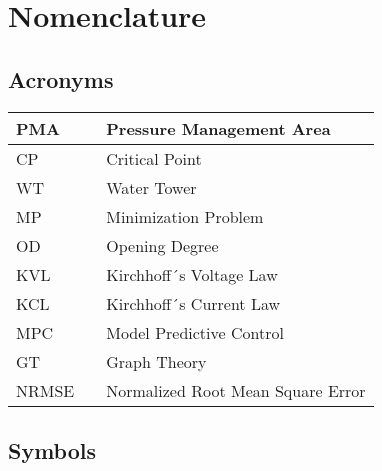 \chapter{Nomenclature}

\section*{Acronyms}
	
	\begin{tabular}{|l c l|} \hline
		PMA 		&&	Pressure Management Area		\\ \hline
		CP			&&	Critical Point					\\ \hline
		WT			&&	Water Tower						\\ \hline
		MP		  	&&	Minimization Problem			\\ \hline
		OD 			&&  Opening Degree					\\ \hline
		KVL 		&&  Kirchhoff´s Voltage Law 		\\ \hline
		KCL 		&&  Kirchhoff´s Current Law			\\ \hline
		MPC			&&  Model Predictive Control		\\ \hline
		GT			&&  Graph Theory					\\ \hline
		NRMSE	    &&  Normalized Root Mean Square Error	\\ \hline
	\end{tabular}

\section*{Symbols}


